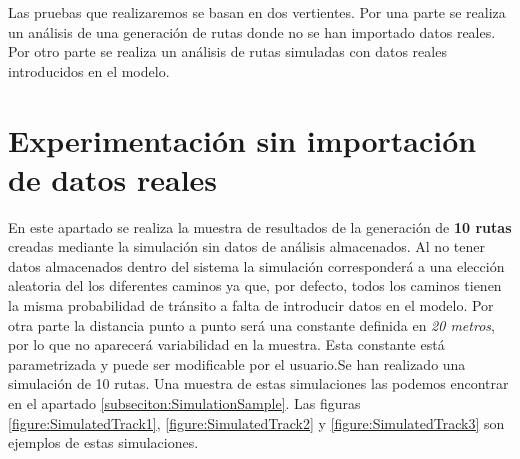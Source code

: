 Las pruebas que realizaremos se basan en dos vertientes. Por una parte se realiza un 
análisis de una 
generación de rutas donde no se han importado datos reales. Por otro parte se realiza 
un análisis de rutas simuladas con datos reales introducidos en el modelo.


\section{Experimentación sin importación de datos reales}
En este apartado se realiza la muestra de resultados de la generación de \textbf{10 
rutas} creadas mediante la simulación sin datos de análisis almacenados. Al no tener 
datos almacenados dentro del sistema la simulación corresponderá a una elección 
aleatoria del los diferentes caminos ya que, por defecto, todos los caminos tienen la 
misma probabilidad de tránsito a falta de introducir datos en el modelo. Por otra parte la 
distancia punto a punto será una constante definida en \textit{20 metros}, por lo que no 
aparecerá variabilidad en la muestra. Esta constante está parametrizada y puede ser 
modificable por el usuario.Se han realizado una simulación de 10 rutas. Una muestra de 
estas simulaciones las podemos encontrar en el apartado 
\ref{subseciton:SimulationSample}. Las figuras \ref{figure:SimulatedTrack1}, 
\ref{figure:SimulatedTrack2} y \ref{figure:SimulatedTrack3} son ejemplos de estas 
simulaciones.
